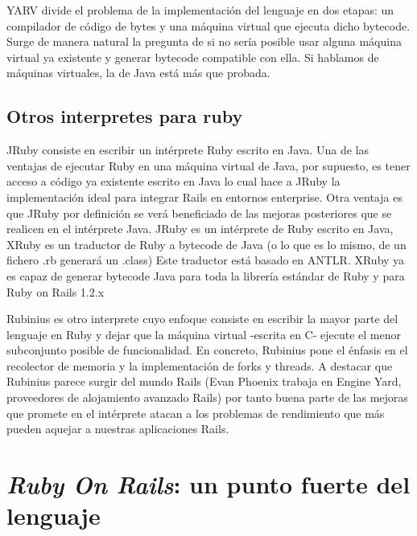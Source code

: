 \documentclass{article}
\begin{document}
YARV divide el problema de la implementación del lenguaje en dos etapas: un compilador de código de bytes y una máquina virtual que ejecuta dicho bytecode. Surge de manera natural la pregunta de si no sería posible usar alguna máquina virtual ya existente y generar bytecode compatible con ella. Si hablamos de máquinas virtuales, la de Java está más que probada.

\subsection{Otros interpretes para ruby}

JRuby consiste en escribir un intérprete Ruby escrito en Java. Una de las ventajas de ejecutar Ruby en una máquina virtual de Java, por supuesto, es tener acceso a código ya existente escrito en Java lo cual hace a JRuby la implementación ideal para integrar Rails en entornos enterprise. Otra ventaja es que JRuby por definición se verá beneficiado de las mejoras posteriores que se realicen en el intérprete Java. JRuby es un intérprete de Ruby escrito en Java, XRuby es un traductor de Ruby a bytecode de Java (o lo que es lo mismo, de un fichero .rb generará un .class) Este traductor está basado en ANTLR. XRuby ya es capaz de generar bytecode Java para toda la librería estándar de Ruby y para Ruby on Rails 1.2.x

Rubinius es otro interprete cuyo enfoque consiste en escribir la mayor parte del lenguaje en Ruby y dejar que la máquina virtual -escrita en C- ejecute el menor subconjunto posible de funcionalidad. En concreto, Rubinius pone el énfasis en el recolector de memoria y la implementación de forks y threads. A destacar que Rubinius parece surgir del mundo Rails (Evan Phoenix trabaja en Engine Yard, proveedores de alojamiento avanzado Rails) por tanto buena parte de las mejoras que promete en el intérprete atacan a los problemas de rendimiento que más pueden aquejar a nuestras aplicaciones Rails.


\section{\textit{Ruby On Rails}: un punto fuerte del lenguaje}
\end{document}
